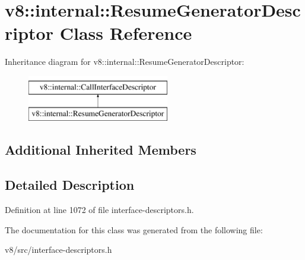 \hypertarget{classv8_1_1internal_1_1ResumeGeneratorDescriptor}{}\section{v8\+:\+:internal\+:\+:Resume\+Generator\+Descriptor Class Reference}
\label{classv8_1_1internal_1_1ResumeGeneratorDescriptor}
Inheritance diagram for v8\+:\+:internal\+:\+:Resume\+Generator\+Descriptor\+:\begin{figure}[H]
\begin{center}
\leavevmode
\includegraphics[height=2.000000cm]{classv8_1_1internal_1_1ResumeGeneratorDescriptor}
\end{center}
\end{figure}
\subsection*{Additional Inherited Members}


\subsection{Detailed Description}


Definition at line 1072 of file interface-\/descriptors.\+h.



The documentation for this class was generated from the following file\+:\begin{DoxyCompactItemize}
\item 
v8/src/interface-\/descriptors.\+h\end{DoxyCompactItemize}

